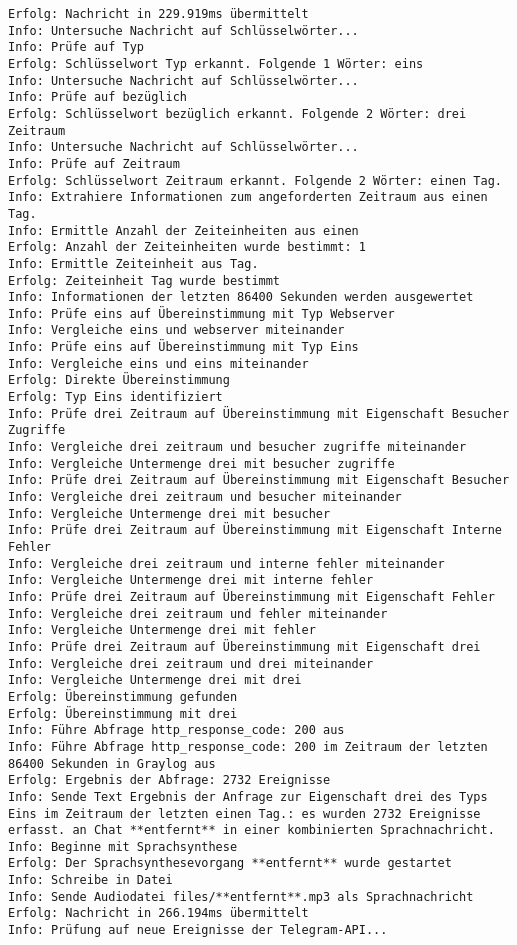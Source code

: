 \begin{lstlisting}[label=log-msg, numbers=none]
Erfolg: Nachricht in 229.919ms übermittelt 
Info: Untersuche Nachricht auf Schlüsselwörter... 
Info: Prüfe auf Typ 
Erfolg: Schlüsselwort Typ erkannt. Folgende 1 Wörter: eins 
Info: Untersuche Nachricht auf Schlüsselwörter... 
Info: Prüfe auf bezüglich 
Erfolg: Schlüsselwort bezüglich erkannt. Folgende 2 Wörter: drei Zeitraum 
Info: Untersuche Nachricht auf Schlüsselwörter... 
Info: Prüfe auf Zeitraum 
Erfolg: Schlüsselwort Zeitraum erkannt. Folgende 2 Wörter: einen Tag. 
Info: Extrahiere Informationen zum angeforderten Zeitraum aus einen Tag. 
Info: Ermittle Anzahl der Zeiteinheiten aus einen 
Erfolg: Anzahl der Zeiteinheiten wurde bestimmt: 1 
Info: Ermittle Zeiteinheit aus Tag. 
Erfolg: Zeiteinheit Tag wurde bestimmt 
Info: Informationen der letzten 86400 Sekunden werden ausgewertet 
Info: Prüfe eins auf Übereinstimmung mit Typ Webserver 
Info: Vergleiche eins und webserver miteinander 
Info: Prüfe eins auf Übereinstimmung mit Typ Eins 
Info: Vergleiche eins und eins miteinander 
Erfolg: Direkte Übereinstimmung 
Erfolg: Typ Eins identifiziert 
Info: Prüfe drei Zeitraum auf Übereinstimmung mit Eigenschaft Besucher Zugriffe 
Info: Vergleiche drei zeitraum und besucher zugriffe miteinander 
Info: Vergleiche Untermenge drei mit besucher zugriffe 
Info: Prüfe drei Zeitraum auf Übereinstimmung mit Eigenschaft Besucher 
Info: Vergleiche drei zeitraum und besucher miteinander 
Info: Vergleiche Untermenge drei mit besucher 
Info: Prüfe drei Zeitraum auf Übereinstimmung mit Eigenschaft Interne Fehler 
Info: Vergleiche drei zeitraum und interne fehler miteinander 
Info: Vergleiche Untermenge drei mit interne fehler 
Info: Prüfe drei Zeitraum auf Übereinstimmung mit Eigenschaft Fehler 
Info: Vergleiche drei zeitraum und fehler miteinander 
Info: Vergleiche Untermenge drei mit fehler 
Info: Prüfe drei Zeitraum auf Übereinstimmung mit Eigenschaft drei 
Info: Vergleiche drei zeitraum und drei miteinander 
Info: Vergleiche Untermenge drei mit drei 
Erfolg: Übereinstimmung gefunden 
Erfolg: Übereinstimmung mit drei 
Info: Führe Abfrage http_response_code: 200 aus 
Info: Führe Abfrage http_response_code: 200 im Zeitraum der letzten 86400 Sekunden in Graylog aus 
Erfolg: Ergebnis der Abfrage: 2732 Ereignisse 
Info: Sende Text Ergebnis der Anfrage zur Eigenschaft drei des Typs Eins im Zeitraum der letzten einen Tag.: es wurden 2732 Ereignisse erfasst. an Chat **entfernt** in einer kombinierten Sprachnachricht. 
Info: Beginne mit Sprachsynthese 
Erfolg: Der Sprachsynthesevorgang **entfernt** wurde gestartet 
Info: Schreibe in Datei 
Info: Sende Audiodatei files/**entfernt**.mp3 als Sprachnachricht 
Erfolg: Nachricht in 266.194ms übermittelt 
Info: Prüfung auf neue Ereignisse der Telegram-API... 
\end{lstlisting}
